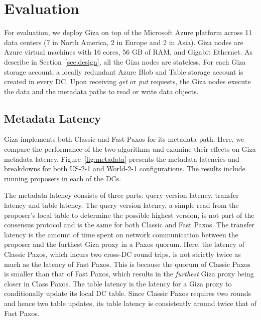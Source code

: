 \section{Evaluation}

For evaluation, we deploy Giza on top of the Microsoft Azure platform across 11 data centers (7 in North America, 2 in Europe and 2 in Asia). Giza nodes are Azure virtual machines with 16 cores, 56 GB of RAM, and Gigabit Ethernet. As describe in Section~\ref{sec:design}, all the Giza nodes are stateless. For each Giza storage account, a locally redundant Azure Blob and Table storage account is created in every DC. Upon receiving {\em get} or {\em put} requests, the Giza nodes execute the data and the metadata paths to read or write data objects.



\subsection{Metadata Latency}

Giza implements both Classic and Fast Paxos for its metadata path. Here, we compare the performance of the two algorithms and examine their effects on Giza metadata latency. Figure~\ref{fig:metadata} presents the metadata latencies and breakdowns for both US-2-1 and World-2-1 configurations. The results include running proposers in each of the DCs.

The metadata latency consists of three parts: query version latency, transfer latency and table latency.
The query version latency, a simple read from the proposer’s local table to determine the possible highest version, is not part of the consensus protocol and is the same for both Classic and Fast Paxos.
The transfer latency is the amount of time spent on network communication between the proposer and the furthest Giza proxy in a Paxos quorum. Here, the latency of Classic Paxos, which incurs two cross-DC round trips, is not strictly twice as much as the latency of Fast Paxos. This is because the quorum of Classic Paxos is smaller than that of Fast Paxos, which results in the {\em furthest} Giza proxy being closer in Class Paxos.
The table latency is the latency for a Giza proxy to conditionally update its local DC table. Since Classic Paxos requires two rounds and hence two table updates, its table latency is consistently around twice that of Fast Paxos.


